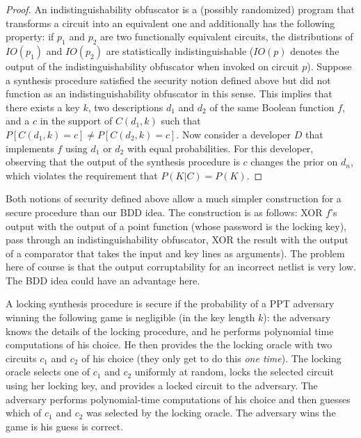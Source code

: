 \begin{proof}
An indistinguishability obfuscator is a (possibly randomized) program that transforms a circuit into an equivalent one and additionally has the following property: if $p_1$ and $p_2$ are two functionally equivalent circuits, the distributions of $IO(p_1)$ and $IO(p_2)$ are statistically indistinguishable ($IO(p)$ denotes the output of the indistinguishability obfuscator when invoked on circuit $p$). Suppose a synthesis procedure satisfied the security notion defined above but did not function as an indistinguishability obfuscator in this sense. This implies that there exists a key $k$, two descriptions $d_1$ and $d_2$ of the same Boolean function $f$, and a $c$ in the support of $C(d_1,k)$ such that $P[C(d_1,k)=c]\neq P[C(d_2,k)=c]$. Now consider a developer $D$ that implements $f$ using $d_1$ or $d_2$ with equal probabilities. For this developer, observing that the output of the synthesis procedure is $c$ changes the prior on $d_n$, which violates the requirement that $P(K|C)=P(K)$.
\end{proof}

Both notions of security defined above allow a much simpler construction for a secure procedure than our BDD idea. The construction is as follows: XOR $f$'s output with the output of a point function (whose password is the locking key), pass through an indistinguishability obfuscator, XOR the result with the output of a comparator that takes the input and key lines as arguments). The problem here of course is that the output corruptability for an incorrect netlist is very low. The BDD idea could have an advantage here.

\begin{definition}
A locking synthesis procedure is secure if the probability of a PPT adversary winning the following game is negligible (in the key length $k$): the adversary knows the details of the locking procedure, and he performs polynomial time computations of his choice. He then provides the the locking oracle with two circuits $c_1$ and $c_2$ of his choice (they only get to do this \emph{one time}). The locking oracle selects one of $c_1$ and $c_2$ uniformly at random, locks the selected circuit using her locking key, and provides a locked circuit to the adversary. The adversary performs polynomial-time computations of his choice and then guesses which of $c_1$ and $c_2$ was selected by the locking oracle. The adversary wins the game is his guess is correct.
\end{definition}

